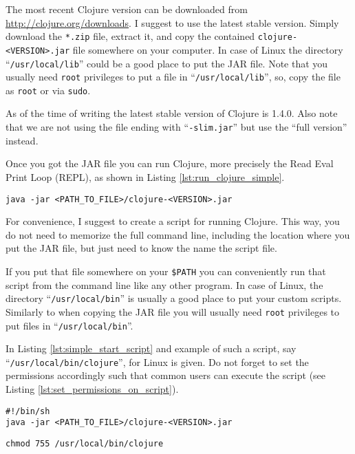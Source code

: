 The most recent Clojure version can be downloaded from \url{http://clojure.org/downloads}.
I suggest to use the latest stable version.
Simply download the \texttt{*.zip} file, extract it, and copy the contained \texttt{clojure-<VERSION>.jar} file somewhere on your computer.
In case of Linux the directory ``\texttt{/usr/local/lib}'' could be a good place to put the JAR file.
Note that you usually need \texttt{root} privileges to put a file in ``\texttt{/usr/local/lib}'', so, copy the file as \texttt{root} or via \texttt{sudo}.

As of the time of writing the latest stable version of Clojure is 1.4.0.
Also note that we are not using the file ending with ``\texttt{-slim.jar}'' but use the ``full version'' instead.

Once you got the JAR file you can run Clojure, more precisely the Read Eval Print Loop (REPL), as shown in Listing \vref{lst:run_clojure_simple}.

\begin{lstlisting}[label=lst:run_clojure_simple, caption=Run Clojure from the Command Line]
java -jar <PATH_TO_FILE>/clojure-<VERSION>.jar
\end{lstlisting}

For convenience, I suggest to create a script for running Clojure.
This way, you do not need to memorize the full command line, including the location where you put the JAR file, but just need to know the name the script file.

If you put that file somewhere on your \texttt{\$PATH} you can conveniently run that script from the command line like any other program.
In case of Linux, the directory ``\texttt{/usr/local/bin}'' is usually a good place to put your custom scripts.
Similarly to when copying the JAR file you will usually need \texttt{root} privileges to put files in ``\texttt{/usr/local/bin}''.

In Listing \vref{lst:simple_start_script} and example of such a script, say ``\texttt{/usr/local/bin/clojure}'', for Linux is given.
Do not forget to set the permissions accordingly such that common users can execute the script (see Listing \vref{lst:set_permissions_on_script}).

\begin{lstlisting}[label=lst:simple_start_script, caption=Simple Script to Run Clojure]
#!/bin/sh
java -jar <PATH_TO_FILE>/clojure-<VERSION>.jar
\end{lstlisting}

\begin{lstlisting}[label=lst:set_permissions_on_script, caption=Setting Permissions for the Start-up Script]
chmod 755 /usr/local/bin/clojure
\end{lstlisting}


